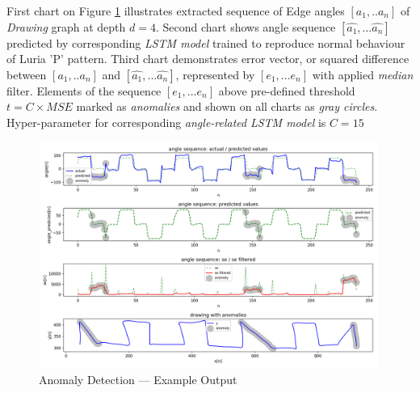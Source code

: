 First chart on Figure \ref{anomaly} illustrates extracted sequence of Edge angles $[a_1,.. a_n]$ of \textit{Drawing} graph at depth $d = 4$. Second chart shows angle sequence $[\hat{a_1}, ...\hat{a_n}]$ predicted by corresponding \textit{LSTM model} trained to reproduce normal behaviour of Luria 'P' pattern. Third chart demonstrates error vector, or squared difference between $[a_1,.. a_n]$ and $[\hat{a_1}, ...\hat{a_n}]$, represented by $[e_1, ...e_n]$ with applied \textit{median} filter. Elements of the sequence $[e_1, ...e_n]$ above pre-defined threshold $t = C \times MSE$ marked as \textit{anomalies} and shown on all charts as \textit{gray circles}. Hyper-parameter for corresponding \textit{angle-related} \textit{LSTM model} is $C = 15$

\begin{figure}[htb]
  \centering
    \includegraphics[width=0.99\textwidth]
        {images/anomaly/anomaly}
    \caption{Anomaly Detection --- Example Output}
    \label{anomaly}
\end{figure}


